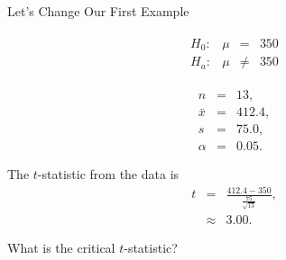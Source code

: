 \begin{frame}{Let's Change Our First Example}


    \begin{eqnarray*}
      \begin{array}{lrcl}
        H_0: & \mu & = & 350 \\
        H_a: & \mu & \neq & 350
      \end{array}
    \end{eqnarray*}

    \begin{eqnarray*}
      n & = & 13, \\
      \bar{x} & = & 412.4,\\
      s      & = & 75.0, \\
      \alpha & = & 0.05.
    \end{eqnarray*}

    \vfill 

    The $t$-statistic from the data is
    \begin{eqnarray*}
      t & = & \frac{412.4-350}{\frac{75}{\sqrt{13}}}, \\
        & \approx & 3.00.
    \end{eqnarray*}


    What is the critical $t$-statistic?

\end{frame}



